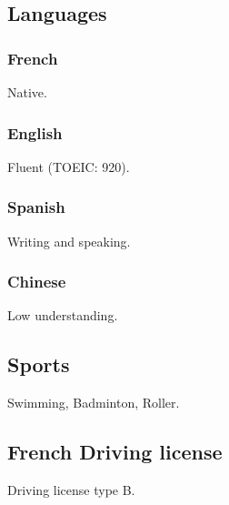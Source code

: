\documentclass{article}
\begin{document}
\begin{multicols}{2}
            \subsection{Languages}
                \subsubsection{French}
                    Native.
                \subsubsection{English}
                    Fluent (TOEIC: 920).
                \subsubsection{Spanish}
                    Writing and speaking.
                \subsubsection{Chinese}
                    Low understanding.
                \subsection{Sports}
                    Swimming, Badminton, Roller.
                \subsection{French Driving license}
                 Driving license type B.
    \end{multicols}
\end{document}
